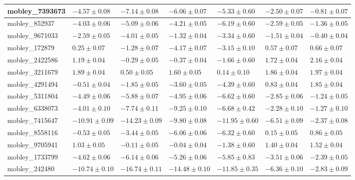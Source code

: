 \documentclass{article}
\begin{document}
\begin{landscape}
\begin{longtable}{|l{3.0cm}|l{3.0cm}|l{3.2cm}|l{3.6cm}|l{3.0cm}|l{3.0cm}|l{3.0cm}|}
mobley\_7393673	&	$	-4.57	\pm	0.08	$	&	$	-7.14	\pm	0.08	$	&	$	-6.06	\pm	0.07	$	&	$	-5.33	\pm	0.60	$	&	$	-2.50	\pm	0.07	$	&	$	-0.81	\pm	0.07	$	\\ \hline
mobley\_852937	&	$	-4.03	\pm	0.06	$	&	$	-5.09	\pm	0.06	$	&	$	-4.21	\pm	0.05	$	&	$	-6.19	\pm	0.60	$	&	$	-2.59	\pm	0.05	$	&	$	-1.36	\pm	0.05	$	\\ \hline
mobley\_9671033	&	$	-2.59	\pm	0.05	$	&	$	-4.01	\pm	0.05	$	&	$	-1.32	\pm	0.04	$	&	$	-3.34	\pm	0.60	$	&	$	-1.51	\pm	0.04	$	&	$	-0.40	\pm	0.04	$	\\ \hline
mobley\_172879	&	$	0.25	\pm	0.07	$	&	$	-1.28	\pm	0.07	$	&	$	-4.17	\pm	0.07	$	&	$	-3.15	\pm	0.10	$	&	$	0.57	\pm	0.07	$	&	$	0.66	\pm	0.07	$	\\ \hline
mobley\_2422586	&	$	1.19	\pm	0.04	$	&	$	-0.29	\pm	0.05	$	&	$	-0.37	\pm	0.04	$	&	$	-1.66	\pm	0.60	$	&	$	1.72	\pm	0.04	$	&	$	2.16	\pm	0.04	$	\\ \hline
mobley\_3211679	&	$	1.89	\pm	0.04	$	&	$	0.50	\pm	0.05	$	&	$	1.60	\pm	0.05	$	&	$	0.14	\pm	0.10	$	&	$	1.86	\pm	0.04	$	&	$	1.97	\pm	0.04	$	\\ \hline
mobley\_4291494	&	$	-0.51	\pm	0.04	$	&	$	-1.85	\pm	0.05	$	&	$	-3.60	\pm	0.05	$	&	$	-4.39	\pm	0.60	$	&	$	0.83	\pm	0.04	$	&	$	1.85	\pm	0.04	$	\\ \hline
mobley\_5311804	&	$	-4.49	\pm	0.06	$	&	$	-5.88	\pm	0.07	$	&	$	-4.95	\pm	0.06	$	&	$	-6.62	\pm	0.60	$	&	$	-2.85	\pm	0.06	$	&	$	-1.24	\pm	0.05	$	\\ \hline
mobley\_6338073	&	$	-4.01	\pm	0.10	$	&	$	-7.74	\pm	0.11	$	&	$	-9.25	\pm	0.10	$	&	$	-6.68	\pm	0.42	$	&	$	-2.28	\pm	0.10	$	&	$	-1.27	\pm	0.10	$	\\ \hline
mobley\_7415647	&	$	-10.91	\pm	0.09	$	&	$	-14.23	\pm	0.09	$	&	$	-9.80	\pm	0.08	$	&	$	-11.95	\pm	0.60	$	&	$	-6.51	\pm	0.09	$	&	$	-2.37	\pm	0.08	$	\\ \hline
mobley\_8558116	&	$	-0.53	\pm	0.05	$	&	$	-3.44	\pm	0.05	$	&	$	-6.06	\pm	0.06	$	&	$	-6.32	\pm	0.60	$	&	$	0.15	\pm	0.05	$	&	$	0.86	\pm	0.05	$	\\ \hline
mobley\_9705941	&	$	1.03	\pm	0.05	$	&	$	-0.11	\pm	0.05	$	&	$	-0.04	\pm	0.04	$	&	$	-1.38	\pm	0.60	$	&	$	1.40	\pm	0.04	$	&	$	1.52	\pm	0.04	$	\\ \hline
mobley\_1733799	&	$	-4.62	\pm	0.06	$	&	$	-6.14	\pm	0.06	$	&	$	-5.26	\pm	0.06	$	&	$	-5.85	\pm	0.83	$	&	$	-3.51	\pm	0.06	$	&	$	-2.39	\pm	0.05	$	\\ \hline
mobley\_242480	&	$	-10.74	\pm	0.10	$	&	$	-16.74	\pm	0.11	$	&	$	-14.48	\pm	0.10	$	&	$	-11.85	\pm	0.35	$	&	$	-6.36	\pm	0.10	$	&	$	-2.83	\pm	0.09	$	\\ \hline

\end{longtable}
\end{landscape}
\end{document}
